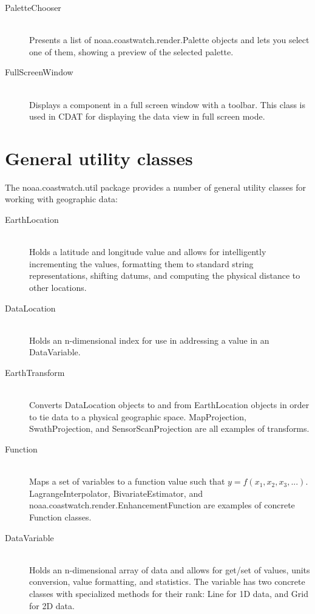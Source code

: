 {\begin{description}
\item[{\java PaletteChooser}]~\\ Presents a list of {\java
noaa.coastwatch.render.Palette} objects and lets you select one
of them, showing a preview of the selected palette.

\item[{\java FullScreenWindow}]~\\ Displays a component in a full
screen window with a toolbar.  This class is used in CDAT for
displaying the data view in full screen mode.

\end{description}

\section{General utility classes}

The {\java noaa.coastwatch.util} package provides a number of
general utility classes for working with geographic data:
\begin{description}

\item[{\java EarthLocation}]~\\ Holds a latitude and longitude
value and allows for intelligently incrementing the values,
formatting them to standard string representations, shifting
datums, and computing the physical distance to other locations.

\item[{\java DataLocation}]~\\ Holds an n-dimensional index for
use in addressing a value in an {\java DataVariable}.

\item[{\java EarthTransform}]~\\ Converts {\java DataLocation}
objects to and from {\java EarthLocation} objects in order to tie
data to a physical geographic space.  {\java MapProjection},
{\java SwathProjection}, and {\java SensorScanProjection} are all
examples of transforms.

\item[{\java Function}]~\\ Maps a set of variables to a function
value such that $y = f(x_1, x_2, x_3, ...)$.  {\java
LagrangeInterpolator}, {\java BivariateEstimator}, and {\java
noaa.coastwatch.render.EnhancementFunction} are examples of
concrete {\java Function} classes.

\item[{\java DataVariable}]~\\ Holds an n-dimensional array of
data and allows for get/set of values, units conversion, value
formatting, and statistics.  The variable has two concrete
classes with specialized methods for their rank: {\java Line} for
1D data, and {\java Grid} for 2D data.


\end{description}}
